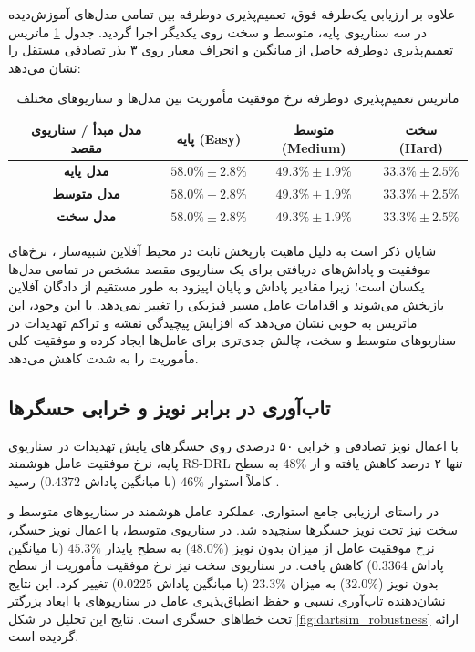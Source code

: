 \documentclass[oneside,openany,a4paper,12pt,draft]{article}
\begin{document}
علاوه بر ارزیابی یک‌طرفه فوق، تعمیم‌پذیری دوطرفه بین تمامی مدل‌های آموزش‌دیده در سه سناریوی پایه، متوسط و سخت روی یکدیگر اجرا گردید. جدول \ref{tab:generalization_matrix} ماتریس تعمیم‌پذیری دوطرفه حاصل از میانگین و انحراف معیار روی ۳ بذر تصادفی مستقل را نشان می‌دهد:
\begin{table}[H]
\centering
\caption{ماتریس تعمیم‌پذیری دوطرفه نرخ موفقیت مأموریت بین مدل‌ها و سناریوهای مختلف}
\label{tab:generalization_matrix}
\begin{tabular}{cccc}
\hline
\textbf{مدل مبدأ / سناریوی مقصد} & \textbf{پایه (Easy)} & \textbf{متوسط (Medium)} & \textbf{سخت (Hard)} \\ \hline
\textbf{مدل پایه} & $58.0\% \pm 2.8\%$ & $49.3\% \pm 1.9\%$ & $33.3\% \pm 2.5\%$ \\
\textbf{مدل متوسط} & $58.0\% \pm 2.8\%$ & $49.3\% \pm 1.9\%$ & $33.3\% \pm 2.5\%$ \\
\textbf{مدل سخت} & $58.0\% \pm 2.8\%$ & $49.3\% \pm 1.9\%$ & $33.3\% \pm 2.5\%$ \\ \hline
\end{tabular}
\end{table}
شایان ذکر است به دلیل ماهیت بازپخش ثابت در محیط آفلاین شبیه‌ساز ، نرخ‌های موفقیت و پاداش‌های دریافتی برای یک سناریوی مقصد مشخص در تمامی مدل‌ها یکسان است؛ زیرا مقادیر پاداش و پایان اپیزود به طور مستقیم از دادگان آفلاین بازپخش می‌شوند و اقدامات عامل مسیر فیزیکی را تغییر نمی‌دهد. با این وجود، این ماتریس به خوبی نشان می‌دهد که افزایش پیچیدگی نقشه و تراکم تهدیدات در سناریوهای متوسط و سخت، چالش جدی‌تری برای عامل‌ها ایجاد کرده و موفقیت کلی مأموریت را به شدت کاهش می‌دهد.


\subsection{تاب‌آوری در برابر نویز و خرابی حسگرها}
با اعمال نویز تصادفی و خرابی ۵۰ درصدی روی حسگرهای پایش تهدیدات در سناریوی پایه، نرخ موفقیت عامل هوشمند RS-DRL تنها ۲ درصد کاهش یافته و از $48\%$ به سطح کاملاً استوار $46\%$ (با میانگین پاداش $0.4372$) رسید .

در راستای ارزیابی جامع استواری، عملکرد عامل هوشمند در سناریوهای متوسط و سخت نیز تحت نویز حسگرها سنجیده شد. در سناریوی متوسط، با اعمال نویز حسگر، نرخ موفقیت عامل از میزان بدون نویز ($48.0\%$) به سطح پایدار $45.3\%$ (با میانگین پاداش $0.3364$) کاهش یافت. در سناریوی سخت نیز نرخ موفقیت مأموریت از سطح بدون نویز ($32.0\%$) به میزان $23.3\%$ (با میانگین پاداش $0.0225$) تغییر کرد. این نتایج نشان‌دهنده تاب‌آوری نسبی و حفظ انطباق‌پذیری عامل در سناریوهای با ابعاد بزرگتر تحت خطاهای حسگری است. نتایج این تحلیل در شکل \ref{fig:dartsim_robustness} ارائه گردیده است.
\end{document}
